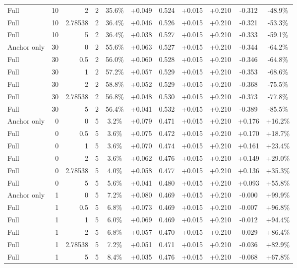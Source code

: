 \begin{table}[htbp]
\begin{tabular}{lrrrccccccc}
Full & 10 & 2 & 2 & 35.6\% & +0.049 & 0.524 & +0.015 & +0.210 & -0.312 & -48.9\% \\
Full & 10 & 2.78538 & 2 & 36.4\% & +0.046 & 0.526 & +0.015 & +0.210 & -0.321 & -53.3\% \\
Full & 10 & 5 & 2 & 36.4\% & +0.038 & 0.527 & +0.015 & +0.210 & -0.333 & -59.1\% \\
Anchor only & 30 & 0 & 2 & 55.6\% & +0.063 & 0.527 & +0.015 & +0.210 & -0.344 & -64.2\% \\
Full & 30 & 0.5 & 2 & 56.0\% & +0.060 & 0.528 & +0.015 & +0.210 & -0.346 & -64.8\% \\
Full & 30 & 1 & 2 & 57.2\% & +0.057 & 0.529 & +0.015 & +0.210 & -0.353 & -68.6\% \\
Full & 30 & 2 & 2 & 58.8\% & +0.052 & 0.529 & +0.015 & +0.210 & -0.368 & -75.5\% \\
Full & 30 & 2.78538 & 2 & 56.8\% & +0.048 & 0.530 & +0.015 & +0.210 & -0.373 & -77.8\% \\
Full & 30 & 5 & 2 & 56.4\% & +0.041 & 0.532 & +0.015 & +0.210 & -0.389 & -85.5\% \\
Anchor only & 0 & 0 & 5 & 3.2\% & +0.079 & 0.471 & +0.015 & +0.210 & +0.176 & +16.2\% \\
Full & 0 & 0.5 & 5 & 3.6\% & +0.075 & 0.472 & +0.015 & +0.210 & +0.170 & +18.7\% \\
Full & 0 & 1 & 5 & 3.6\% & +0.070 & 0.474 & +0.015 & +0.210 & +0.161 & +23.4\% \\
Full & 0 & 2 & 5 & 3.6\% & +0.062 & 0.476 & +0.015 & +0.210 & +0.149 & +29.0\% \\
Full & 0 & 2.78538 & 5 & 4.0\% & +0.058 & 0.477 & +0.015 & +0.210 & +0.136 & +35.3\% \\
Full & 0 & 5 & 5 & 5.6\% & +0.041 & 0.480 & +0.015 & +0.210 & +0.093 & +55.8\% \\
Anchor only & 1 & 0 & 5 & 7.2\% & +0.080 & 0.469 & +0.015 & +0.210 & -0.000 & +99.9\% \\
Full & 1 & 0.5 & 5 & 6.8\% & +0.073 & 0.469 & +0.015 & +0.210 & -0.007 & +96.8\% \\
Full & 1 & 1 & 5 & 6.0\% & +0.069 & 0.469 & +0.015 & +0.210 & -0.012 & +94.4\% \\
Full & 1 & 2 & 5 & 6.8\% & +0.057 & 0.470 & +0.015 & +0.210 & -0.029 & +86.4\% \\
Full & 1 & 2.78538 & 5 & 7.2\% & +0.051 & 0.471 & +0.015 & +0.210 & -0.036 & +82.9\% \\
Full & 1 & 5 & 5 & 8.4\% & +0.035 & 0.476 & +0.015 & +0.210 & -0.068 & +67.8\% \\

\end{tabular}
\end{table}
